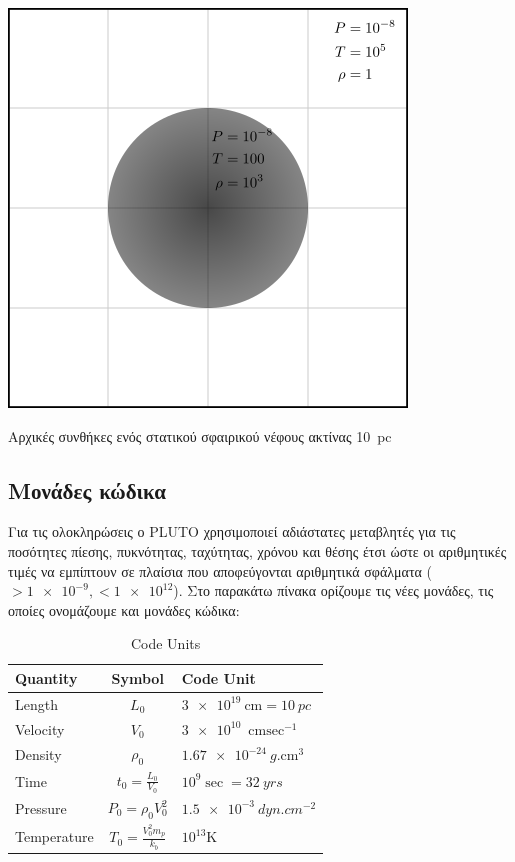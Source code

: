 			\begin{marginfigure}
				\centering
				\includegraphics[width=0.7\linewidth]{Images/rect4578.png}
				\caption{Αρχικές συνθήκες ενός στατικού σφαιρικού νέφους ακτίνας \SI{10}{pc}}
				\label{fig:rect4578}
			\end{marginfigure}
		

	
	\subsection{Μονάδες κώδικα}
	Για τις ολοκληρώσεις ο PLUTO χρησιμοποιεί αδιάστατες μεταβλητές για τις ποσότητες πίεσης, πυκνότητας, ταχύτητας, χρόνου και θέσης έτσι ώστε οι αριθμητικές τιμές να εμπίπτουν σε πλαίσια που αποφεύγονται αριθμητικά σφάλματα ($>\num{1e-9},<\num{1e12}$). Στο παρακάτω πίνακα ορίζουμε τις νέες μονάδες, τις οποίες ονομάζουμε και μονάδες κώδικα: 
	
			\begin{table}[H]
				\centering
				\caption{Code Units}
				\label{tab:cd}
				\begin{tabular}{|l|  c |  l|}
					\toprule
					Quantity & Symbol & Code Unit\\ 
					\midrule
					Length & $L_0$ & $\SI{3e19}{\cm} = \SI{10}{pc}$ \\
					Velocity & $V_0$ & $\SI{3e10}{\cm \sec^{-1}}$\\
					Density& $\rho_0$&$\SI{1.67e-24}{g.\cm^3}$\\
					Time & $t_0=\frac{L_0}{V_0}$ & $10^9\si{\sec} =\SI{32}{yrs}$\\
					Pressure & $P_0=\rho_0 V_0^2$ &$\SI{1.5e-3}{dyn.cm^{-2}}$ \\
					Temperature &$T_0=\frac{V_0^2m_p}{k_b}$&$10^{13}\si{\kelvin}$  \\		
					\bottomrule
				\end{tabular}
			\end{table}

